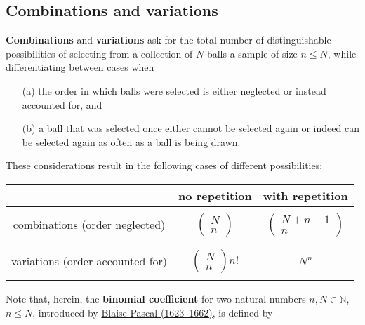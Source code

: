 \subsection{Combinations and variations}
\textbf{Combinations} and \textbf{variations} ask for the total
number of distinguishable possibilities of selecting from a
collection of $N$ balls a sample of size $n \leq N$, while
differentiating between cases when
%
\begin{itemize}
\item[(a)] the order in which balls were selected is either 
neglected or instead accounted for, and

\item[(b)] a ball that was selected once either cannot be selected 
again or indeed can be selected again as often as a ball is being 
drawn.

\end{itemize}
%
These considerations result in the following cases of different 
possibilities:
%
\begin{center}
    \begin{tabular}[h!]{c|c|c}
     & no repetition & with repetition \\
    \hline
     & & \\
    combinations (order neglected) & $\left(\begin{array}{c}
    N \\ n \end{array}\right)$ & $\left(\begin{array}{c}
    N+n-1 \\ n \end{array}\right)$ \\
     & & \\
    \hline
     & & \\
    variations (order accounted for) & $\left(\begin{array}{c}
    N \\ n \end{array}\right)n!$ & $N^{n}$ \\
     & & \\
    \end{tabular}
\end{center}
%
Note that, herein, the \textbf{binomial coefficient} for two
natural numbers $n, N \in \mathbb{N}$, $n \leq N$, introduced by
\href{http://www-history.mcs.st-and.ac.uk/Biographies/Pascal.html}{Blaise Pascal (1623--1662)}, is defined by
